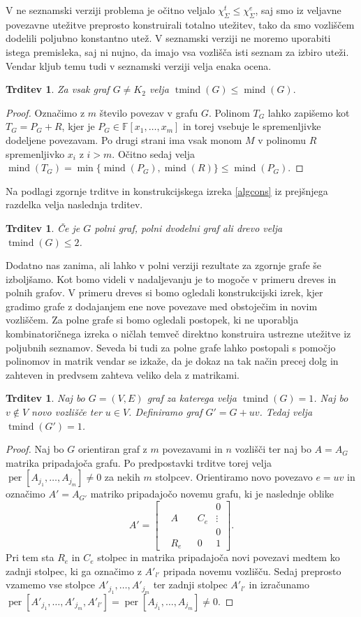 \documentclass[12pt,a4paper,twoside]{article}
\theoremstyle{definition} %
\theoremstyle{plain} %
\newtheorem{trditev}[definicija]{Trditev}
\newcommand{\ec}{\chi_{\Sigma}^e}
\newcommand{\ect}{\chi_{\Sigma}^t}
\numberwithin{equation}{section}  %
\DeclareMathOperator{\per}{per}
\DeclareMathOperator{\mind}{mind}
\DeclareMathOperator{\tmind}{tmind}
\begin{document}
V ne seznamski verziji problema je očitno veljalo $\ect \le \ec$, saj smo iz veljavne povezavne utežitve preprosto konstruirali totalno utežitev, tako da smo vozliščem dodelili poljubno konstantno utež. V seznamski verziji ne moremo uporabiti istega premisleka, saj ni nujno, da imajo vsa vozlišča isti seznam za izbiro uteži. Vendar kljub temu tudi v seznamski verziji velja enaka ocena.
\begin{trditev}
Za vsak graf $G \neq K_2$ velja $\tmind(G) \le \mind(G).$
\end{trditev}
\begin{proof}
Označimo z $m$ število povezav v grafu $G$. Polinom $T_G$ lahko zapišemo kot $T_G = P_G + R$, kjer je $P_G \in \mathbb{F}[x_1, \ldots, x_m]$ in torej vsebuje le spremenljivke dodeljene povezavam. Po drugi strani ima vsak monom $M$ v polinomu $R$ spremenljivko $x_i$ z $i > m$. Očitno sedaj velja $\mind(T_G) = \min \{\mind(P_G),\mind(R)\} \le \mind(P_G)$.
\end{proof}
Na podlagi zgornje trditve in konstrukcijskega izreka \ref{algcons} iz prejšnjega razdelka velja naslednja trditev.
\begin{trditev}
Če je $G$ polni graf, polni dvodelni graf ali drevo velja $\tmind(G) \le 2$.
\end{trditev}
Dodatno nas zanima, ali lahko v polni verziji rezultate za zgornje grafe še izboljšamo. Kot bomo videli v nadaljevanju je to mogoče v primeru dreves in polnih grafov. V primeru dreves si bomo ogledali konstrukcijski izrek, kjer gradimo grafe z dodajanjem ene nove povezave med obstoječim in novim  vozliščem. Za polne grafe si bomo ogledali postopek, ki ne uporablja kombinatoričnega izreka o ničlah temveč direktno konstruira ustrezne utežitve iz poljubnih seznamov. Seveda bi tudi za polne grafe lahko postopali s pomočjo polinomov in matrik vendar se izkaže, da je dokaz na tak način precej dolg in zahteven in predvsem zahteva veliko dela z matrikami.
\begin{trditev}
Naj bo $G=(V,E)$ graf za katerega velja $\tmind(G) = 1$. Naj bo $v \notin V$ novo vozlišče ter $u \in V$. Definiramo graf $G' = G + uv$. Tedaj velja $\tmind(G') =1$.
\end{trditev}
 \begin{proof}
Naj bo $G$ orientiran graf z $m$ povezavami in $n$ vozlišči ter naj bo $A = A_G$ matrika pripadajoča grafu. Po predpostavki trditve torej velja $\per[A_{j_1}, \ldots, A_{j_m}]  \neq 0$ za nekih $m$ stolpcev. Orientiramo novo povezavo $e = uv$ in označimo $A' = A_{G'}$ matriko pripadajočo novemu grafu, ki je naslednje oblike
$$
A' = \left[ \begin{matrix}
  &  &  &  & 0 \\
  & A &  & C_e & \vdots \\
  &  &  &  & 0 \\ 
 & R_e &  & 0 & 1 
\end{matrix} \right].
$$
Pri tem sta $R_e$ in $C_e$ stolpec in matrika pripadajoča novi povezavi medtem ko zadnji stolpec, ki ga označimo z $A'_{l'}$ pripada novemu vozlišču. Sedaj preprosto vzamemo vse stolpce $A'_{j_1}, \ldots, A'_{j_m}$ ter zadnji stolpec $A'_{l'}$ in izračunamo 
$\per[A'_{j_1}, \ldots, A'_{j_m}, A'_{l'} ] = \per[A_{j_1}, \ldots, A_{j_m}]  \neq 0$.
\end{proof}
\end{document}
